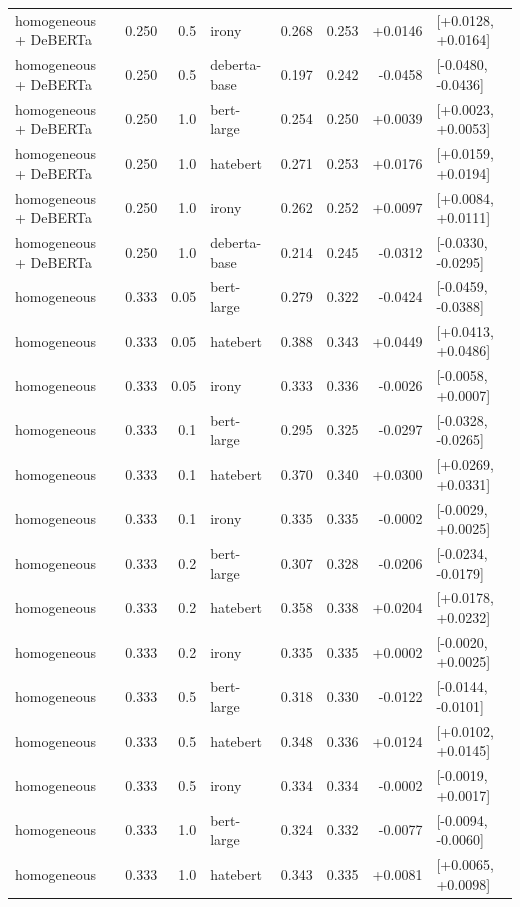 \begin{table}[t]
\begin{tabular}{lrrlrrrl}
homogeneous + DeBERTa & 0.250 & 0.5 & irony & 0.268 & 0.253 & +0.0146 & [+0.0128, +0.0164] \\
homogeneous + DeBERTa & 0.250 & 0.5 & deberta-base & 0.197 & 0.242 & -0.0458 & [-0.0480, -0.0436] \\
homogeneous + DeBERTa & 0.250 & 1.0 & bert-large & 0.254 & 0.250 & +0.0039 & [+0.0023, +0.0053] \\
homogeneous + DeBERTa & 0.250 & 1.0 & hatebert & 0.271 & 0.253 & +0.0176 & [+0.0159, +0.0194] \\
homogeneous + DeBERTa & 0.250 & 1.0 & irony & 0.262 & 0.252 & +0.0097 & [+0.0084, +0.0111] \\
homogeneous + DeBERTa & 0.250 & 1.0 & deberta-base & 0.214 & 0.245 & -0.0312 & [-0.0330, -0.0295] \\
homogeneous & 0.333 & 0.05 & bert-large & 0.279 & 0.322 & -0.0424 & [-0.0459, -0.0388] \\
homogeneous & 0.333 & 0.05 & hatebert & 0.388 & 0.343 & +0.0449 & [+0.0413, +0.0486] \\
homogeneous & 0.333 & 0.05 & irony & 0.333 & 0.336 & -0.0026 & [-0.0058, +0.0007] \\
homogeneous & 0.333 & 0.1 & bert-large & 0.295 & 0.325 & -0.0297 & [-0.0328, -0.0265] \\
homogeneous & 0.333 & 0.1 & hatebert & 0.370 & 0.340 & +0.0300 & [+0.0269, +0.0331] \\
homogeneous & 0.333 & 0.1 & irony & 0.335 & 0.335 & -0.0002 & [-0.0029, +0.0025] \\
homogeneous & 0.333 & 0.2 & bert-large & 0.307 & 0.328 & -0.0206 & [-0.0234, -0.0179] \\
homogeneous & 0.333 & 0.2 & hatebert & 0.358 & 0.338 & +0.0204 & [+0.0178, +0.0232] \\
homogeneous & 0.333 & 0.2 & irony & 0.335 & 0.335 & +0.0002 & [-0.0020, +0.0025] \\
homogeneous & 0.333 & 0.5 & bert-large & 0.318 & 0.330 & -0.0122 & [-0.0144, -0.0101] \\
homogeneous & 0.333 & 0.5 & hatebert & 0.348 & 0.336 & +0.0124 & [+0.0102, +0.0145] \\
homogeneous & 0.333 & 0.5 & irony & 0.334 & 0.334 & -0.0002 & [-0.0019, +0.0017] \\
homogeneous & 0.333 & 1.0 & bert-large & 0.324 & 0.332 & -0.0077 & [-0.0094, -0.0060] \\
homogeneous & 0.333 & 1.0 & hatebert & 0.343 & 0.335 & +0.0081 & [+0.0065, +0.0098] \\

\end{tabular}
\end{table}
